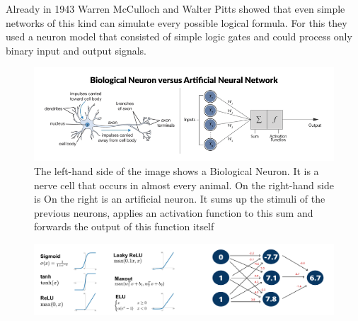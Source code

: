 Already in 1943 Warren McCulloch and Walter Pitts \cite{mcculloch} showed that even simple networks of this kind can simulate every possible logical formula. For this they used a neuron model that consisted of simple logic gates and could process only binary input and output signals.

\begin{figure}
	\centering
	\includegraphics[width=1\linewidth]{Figures/chap1/bio_vs_arti_neuron.png}
	\caption[Caption for LOF]{The left-hand side of the image \footnotemark shows a Biological Neuron. It is a nerve cell that occurs in almost every animal. On the right-hand side is On the right is an artificial neuron. It sums up the stimuli of the previous neurons, applies an activation function to this sum and forwards the output of this function itself}
	\label{fig:test1}
\end{figure}


\begin{figure}
	\centering
	\includegraphics[width=\linewidth]{Figures/chap1/ActivFunctionsSimpleANN.png}
	\caption{\todo}
	\label{fig:test1}
\end{figure}

